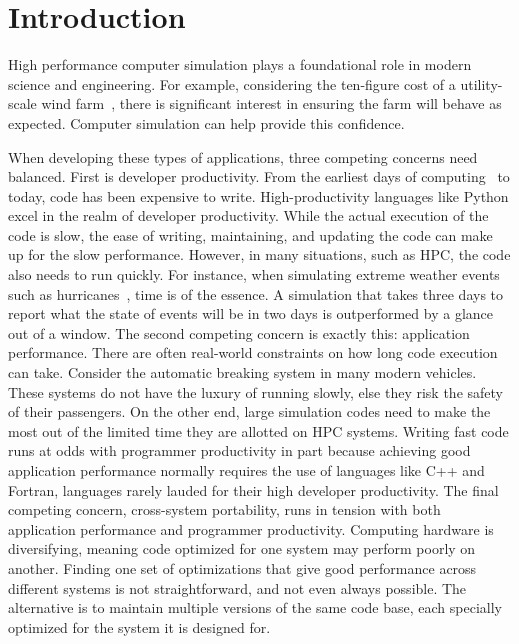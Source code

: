 \chapter{Introduction}

High performance computer simulation plays a foundational role in modern science and engineering.
For example, considering the ten-figure cost of a utility-scale wind farm~\cite{farmCost}, there is significant interest in ensuring the farm will behave as expected. 
Computer simulation can help provide this confidence.

When developing these types of applications, three competing concerns need balanced. 
First is developer productivity.
From the earliest days of computing~\cite{backus1957fortran} to today, code has been expensive to write.
High-productivity languages like Python excel in the realm of developer productivity.
While the actual execution of the code is slow, the ease of writing, maintaining, and updating the code can make up for the slow performance.
However, in many situations, such as HPC, the code also needs to run quickly.
For instance, when simulating extreme weather events such as hurricanes~\cite{fu2017redesigning}, time is of the essence. 
A simulation that takes three days to report what the state of events will be in two days is outperformed by a glance out of a window.
The second competing concern is exactly this: application performance.
There are often real-world constraints on how long code execution can take.
Consider the automatic breaking system in many modern vehicles.
These systems do not have the luxury of running slowly, else they risk the safety of their passengers.
On the other end, large simulation codes need to make the most out of the limited time they are allotted on HPC systems.
Writing fast code runs at odds with programmer productivity in part because achieving good application performance normally requires the use of languages like C++ and Fortran, languages rarely lauded for their high developer productivity.
The final competing concern, cross-system portability, runs in tension with both application performance and programmer productivity.
Computing hardware is diversifying, meaning code optimized for one system may perform poorly on another.
Finding one set of optimizations that give good performance across different systems is not straightforward, and not even always possible.
The alternative is to maintain multiple versions of the same code base, each specially optimized for the system it is designed for.

